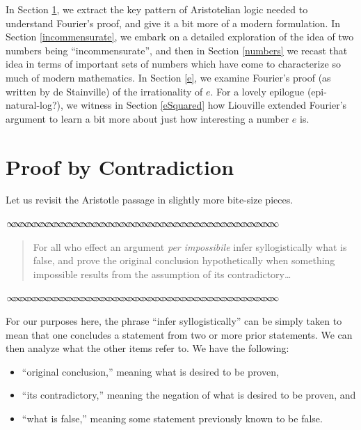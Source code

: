 \documentclass[11pt]{article}
\newcommand{\sep}{\vspace{-3pt}
\begin{center}
{\mathversion{normal}
$\infty \mspace{-5.5mu}\infty \mspace{-5.5mu}\infty \mspace{-5.5mu}\infty \mspace{-5.5mu}
\infty \mspace{-5.5mu}\infty \mspace{-5.5mu}\infty \mspace{-5.5mu}\infty \mspace{-5.5mu}
\infty \mspace{-5.5mu}\infty \mspace{-5.5mu}\infty \mspace{-5.5mu}\infty \mspace{-5.5mu}
\infty \mspace{-5.5mu}\infty \mspace{-5.5mu}\infty \mspace{-5.5mu}\infty \mspace{-5.5mu}
\infty \mspace{-5.5mu}\infty \mspace{-5.5mu}\infty \mspace{-5.5mu}\infty \mspace{-5.5mu}
\infty \mspace{-5.5mu}\infty \mspace{-5.5mu}\infty \mspace{-5.5mu}\infty \mspace{-5.5mu}
\infty \mspace{-5.5mu}\infty \mspace{-5.5mu}\infty \mspace{-5.5mu}\infty \mspace{-5.5mu}
\infty \mspace{-5.5mu}\infty \mspace{-5.5mu}\infty \mspace{-5.5mu}\infty \mspace{-5.5mu}
\infty \mspace{-5.5mu}\infty \mspace{-5.5mu}\infty \mspace{-5.5mu}\infty \mspace{-5.5mu}
\infty \mspace{-5.5mu}\infty \mspace{-5.5mu}\infty \mspace{-5.5mu}\infty \mspace{-5.5mu}$}
\end{center} \vspace*{-5pt}}
\newenvironment{source}%
 {\bigskip \sep \vspace*{-6pt} \begin{quote}
          \begin{sf}   }
   {   \end{sf}     \end{quote} \vspace*{-6pt} \sep \bigskip}%
\begin{document}
In Section \ref{contradiction}, we extract the key pattern of Aristotelian logic needed to understand Fourier's proof, and give it a bit more of a modern formulation.  In Section \ref{incommensurate}, we embark on a detailed exploration of the idea of two numbers being ``{\sf incommensurate}'', and then in Section \ref{numbers} we recast that idea in terms of important sets of numbers which have come to characterize so much of modern mathematics.  In Section \ref{e}, we examine Fourier's proof (as written by de Stainville) of the irrationality of $e$.  For a lovely epilogue (epi-natural-log?), we witness in Section \ref{eSquared} how Liouville extended Fourier's argument to learn a bit more about just how interesting a number $e$ is.

\section{Proof by Contradiction}\label{contradiction}

Let us revisit the Aristotle passage in slightly more bite-size pieces.  

\begin{source} For all who effect an argument \emph{per impossibile} infer syllogistically what is false, and prove the original conclusion hypothetically when something impossible results from the assumption of its contradictory\ldots 
\end{source}

For our purposes here, the phrase ``{\sf infer syllogistically}'' can be simply taken to mean that one concludes a statement from two or more prior statements. We can then analyze what the other items refer to.  We have the following: 
\begin{itemize}
    \item ``{\sf original conclusion,}'' meaning what is desired to be proven,
    \item ``{\sf its contradictory,}'' meaning the negation of what is desired to be proven, and
    \item ``{\sf what is false,}'' meaning some statement previously known to be false.
\end{itemize}
\end{document}
